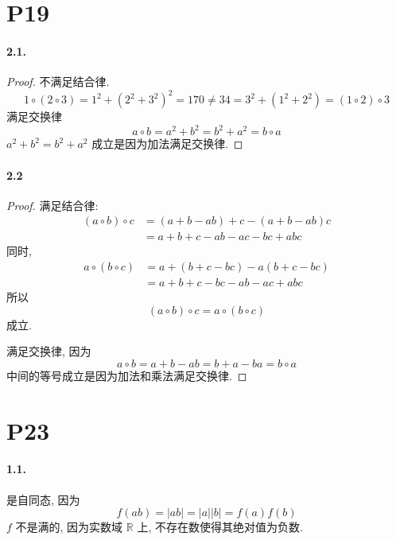 \documentclass[12pt]{ctexart}
\theoremstyle{definition}
\theoremstyle{definition}
\theoremstyle{plain}
\theoremstyle{remark}
\begin{document}
\section*{P19}\label{sec:p19}
\paragraph{2.1.}  
\begin{proof}
不满足结合律. 
\begin{equation}
	1 \circ (2 \circ 3)  = 1 ^{2} + (2 ^{2} + 3^{2}) ^{2} = 170 \ne 34 = 3 ^{2} + (1 ^{2} + 2^{2}) = (1 \circ 2 ) \circ 3
\end{equation}
满足交换律
\begin{equation}
a \circ b = a ^{2} + b ^{2} = b ^{2} + a ^{2} = b \circ a
\end{equation}
\(a^{2} + b^{2} = b^{2} + a^{2}\) 成立是因为加法满足交换律.
\end{proof}

\paragraph{2.2} 
\begin{proof}
满足结合律: 
\[
\begin{aligned}
	(a \circ b ) \circ c & = (a + b - ab ) +c - (a+b -ab ) c \\
	& = a + b + c - ab - ac - bc + abc
\end{aligned}
\]
同时, 
\[
\begin{aligned}
	a \circ (b \circ c) & = a + (b + c - bc ) - a (b +c - bc) \\ 
	& = a + b  +c - bc - ab - ac + abc 
\end{aligned}
\]
所以
\begin{equation}
(a \circ b ) \circ c = a \circ (b \circ c)
\end{equation}
成立.

满足交换律, 因为 
\begin{equation}
a \circ b = a + b - ab = b + a - ba = b \circ a
\end{equation} 
中间的等号成立是因为加法和乘法满足交换律. 
\end{proof}

\section*{P23}\label{sec:p23}
\paragraph{1.1.}
是自同态, 因为
\begin{equation}
	f (a b ) = |ab | = |a| |b | = f (a ) f (b) 
\end{equation}
\(f	\) 不是满的, 因为实数域 \(\mathbb{R}\) 上, 不存在数使得其绝对值为负数. 
\end{document}
